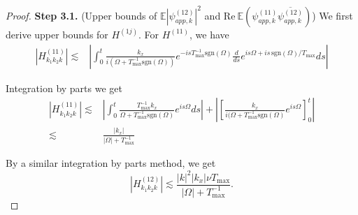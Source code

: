 \begin{proof}
\textbf{Step 3.1.} (Upper bounds of $\mathbb E \left|\psi^{(12)}_{app,k}\right|^2$ and $\text{Re}\ \mathbb E \left(\psi^{(11)}_{app,k}\overline{\psi^{(12)}_{app,k}}\right)$) We first derive upper bounds for $H^{(1j)}$. For $H^{(11)}$, we have
\begin{equation}
\begin{split}
    |H^{(11)}_{k_1k_2k}|\lesssim& \left|\int^{t}_0\frac{k_x}{i(\Omega+T^{-1}_{\text{max}}\text{sgn}(\Omega))}e^{-isT^{-1}_{\text{max}}\text{sgn}(\Omega)}\frac{d}{ds}e^{i s\Omega+is\, \text{sgn}(\Omega)/T_{\text{max}}} ds\right|
\end{split}
\end{equation}

Integration by parts we get 
\begin{equation}\label{eq.H(11)bound.threewave}
\begin{split}
    |H^{(11)}_{k_1k_2k}|\lesssim&\left|\int^{t}_0\frac{T_{\text{max}}^{-1}k_x}{\Omega+T^{-1}_{\text{max}}\text{sgn}(\Omega)}e^{i s\Omega} ds\right|+\left|\left[\frac{k_x}{i(\Omega+T^{-1}_{\text{max}}\text{sgn}(\Omega)}e^{i s\Omega}\right]_{0}^t\right|
    \\
    \lesssim& \frac{|k_x|}{|\Omega|+T^{-1}_{\text{max}}}
\end{split}
\end{equation}

By a similar integration by parts method, we get
\begin{equation}\label{eq.H(12)bound.threewave}
    |H^{(12)}_{k_1k_2k}|\lesssim \frac{|k|^2|k_x|\nu T_{\text{max}}}{|\Omega|+T^{-1}_{\text{max}}}.
\end{equation}


\end{proof}
